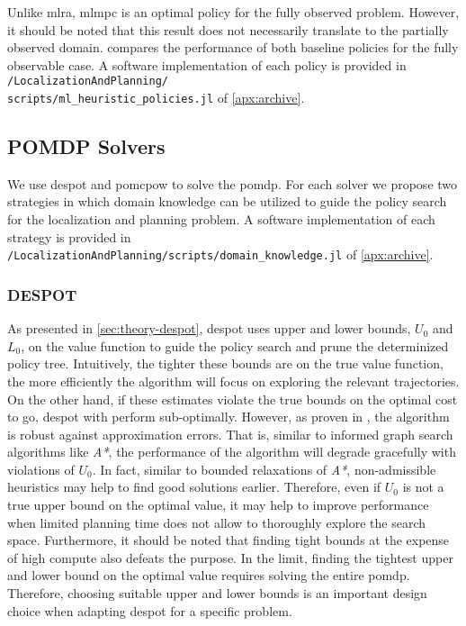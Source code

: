 Unlike \ac{mlra}, \ac{mlmpc} is an optimal policy for the fully observed
problem. However, it should be noted that this result does not necessarily
translate to the partially observed domain.  compares
the performance of both baseline policies for the fully observable case.
A software implementation of each policy is provided in
\texttt{\appdata/LocalizationAndPlanning/\\scripts/ml\_heuristic\_policies.jl}
of \cref{apx:archive}.

\subsection{POMDP Solvers}\label{sec:lp-planners}

We use \ac{despot} and \ac{pomcpow} to solve the \ac{pomdp}. For each solver we
propose two strategies in which domain knowledge can be utilized to guide the
policy search for the localization and planning problem. A software
implementation of each strategy is provided in
\texttt{\appdata/LocalizationAndPlanning/scripts/domain\_knowledge.jl}
of \cref{apx:archive}.

\subsubsection{DESPOT}\label{sec:lp-planners-despot}

As presented in \cref{sec:theory-despot}, \ac{despot} uses upper and lower
bounds, $U_0$ and $L_0$, on the value function to guide the policy search and
prune the determinized policy tree. Intuitively, the tighter these bounds are on
the true value function, the more efficiently the algorithm will focus on
exploring the relevant trajectories. On the other hand, if these estimates
violate the true bounds on the optimal cost to go, \ac{despot} with perform
sub-optimally. However, as proven in \cite{somani2013despot}, the algorithm is
robust against approximation errors. That is, similar to informed graph search
algorithms like \emph{A*}, the performance of the algorithm will degrade
gracefully with violations of $U_0$. In fact, similar to bounded relaxations of
\emph{A*}, non-admissible heuristics may help to find good solutions earlier.
Therefore, even if $U_0$ is not a true upper bound on the optimal value, it may
help to improve performance when limited planning time does not allow to
thoroughly explore the search space. Furthermore, it should be noted that
finding tight bounds at the expense of high compute also defeats the purpose.
In the limit, finding the tightest upper and lower bound on the optimal value
requires solving the entire \ac{pomdp}. Therefore, choosing suitable upper and
lower bounds is an important design choice when adapting \ac{despot} for
a specific problem.

